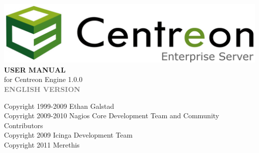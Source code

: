 \documentclass[a4paper]{book}
\begin{document}
\begin{titlepage}
\vspace*{1.5cm}
\begin{center}
\mbox{\includegraphics{centreon_logo}}
\vspace*{2cm}
{\fontsize{16}{16} \bf USER MANUAL }\\
{\large for Centreon Engine 1.0.0 }\\
\vspace*{0.5cm}
{\textcolor{gray}{\large \bf ENGLISH VERSION }}\\
\vspace*{6cm}
\end{center}
\end{titlepage}
{\small Copyright 1999-2009 Ethan Galstad\\Copyright 2009-2010 Nagios Core Development Team and Community Contributors\\Copyright 2009 Icinga Development Team\\Copyright 2011 Merethis}\\
\clearemptydoublepage
{}
\tableofcontents
\clearemptydoublepage
{}
\end{document}
